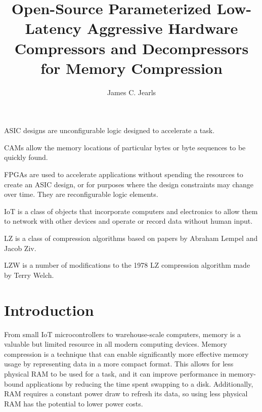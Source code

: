\documentclass[doublespace,nopageskip]{VTthesis}
\title{Open-Source Parameterized Low-Latency Aggressive Hardware Compressors and Decompressors for Memory Compression}
\author{James C. Jearls}
\begin{document}
  \frontmatter
  \maketitle
  \tableofcontents

	\listoffigures
	\listoftables
    \printnomenclature %


ASIC designs are unconfigurable logic designed to accelerate a task.


CAMs allow the memory locations of particular bytes or byte sequences to be quickly found.


FPGAs are used to accelerate applications without spending the resources to create an ASIC design, or for purposes where the design constraints may change over time. They are reconfigurable logic elements.


IoT is a class of objects that incorporate computers and electronics to allow them to network with other devices and operate or record data without human input.


LZ is a class of compression algorithms based on papers by Abraham Lempel and Jacob Ziv.
 
 
LZW is a number of modifications to the 1978 LZ compression algorithm made by Terry Welch.
 

\mainmatter

\chapter{Introduction} \label{ch:introduction}
From small IoT microcontrollers to warehouse-scale computers, memory is a valuable but limited resource in all modern computing devices. Memory compression is a technique that can enable significantly more effective memory usage by representing data in a more compact format. This allows for less physical RAM to be used for a task, and it can improve performance in memory-bound applications by reducing the time spent swapping to a disk. Additionally, RAM requires a constant power draw to refresh its data, so using less physical RAM has the potential to lower power costs.
\end{document}
